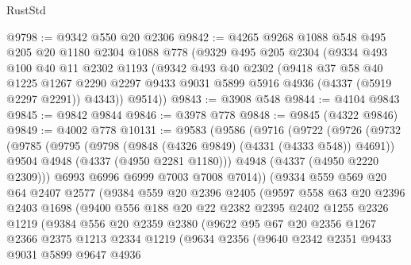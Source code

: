 \begin{lexlean}{RustStd}
\begin{coremodule}
@9798 := @9342 @550 @20 @2306
@9842 := @4265
    @9268
    @1088
    @548
    @495
    @205
    @20
    @1180
    @2304
    @1088
    @778
    (@9329
      @495
      @205
      @2304
      (@9334
        @493
        @100
        @40
        @11
        @2302
        @1193
        (@9342
          @493
          @40
          @2302
          (@9418
            @37
            @58
            @40
            @1225
            @1267
            @2290
            @2297
            @9433
            @9031
            @5899
            @5916
            @4936
            (@4337 (@5919 @2297 @2291))
            @4343))
        @9514))
@9843 := @3908 @548
@9844 := @4104 @9843
@9845 := @9842 @9844
@9846 := @3978 @778
@9848 := @9845 (@4322 @9846)
@9849 := @4002 @778
@10131 := @9583
    (@9586
      (@9716
        (@9722
          (@9726
            (@9732
              (@9785
                (@9795
                  (@9798 (@9848 (@4326 @9849) (@4331 (@4333 @548)) @4691))
                  @9504
                  @4948
                  (@4337 (@4950 @2281 @1180)))
                @4948
                (@4337 (@4950 @2220 @2309)))
              @6993
              @6996
              @6999
              @7003
              @7008
              @7014))
          (@9334
            @559
            @569
            @20
            @64
            @2407
            @2577
            (@9384
              @559
              @20
              @2396
              @2405
              (@9597
                @558
                @63
                @20
                @2396
                @2403
                @1698
                (@9400
                  @556
                  @188
                  @20
                  @22
                  @2382
                  @2395
                  @2402
                  @1255
                  @2326
                  @1219
                  (@9384
                    @556
                    @20
                    @2359
                    @2380
                    (@9622
                      @95
                      @67
                      @20
                      @2356
                      @1267
                      @2366
                      @2375
                      @1213
                      @2334
                      @1219
                      (@9634
                        @2356
                        (@9640
                          @2342
                          @2351
                          @9433
                          @9031
                          @5899
                          @9647
                          @4936

\end{coremodule}
\end{lexlean}
